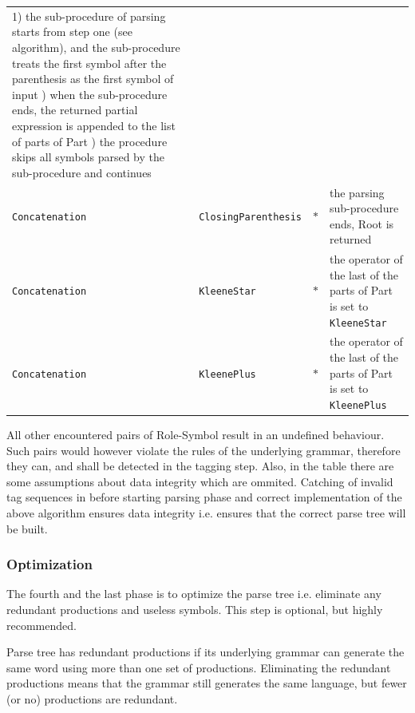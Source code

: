 \documentclass{article}
\begin{document}
\begin{tabularx}{\textwidth}{l|l|l|X}
1) the sub-procedure of parsing starts from step one (see algorithm), and the sub-procedure treats the first
symbol after the parenthesis as the first symbol of input \newline
2) when the sub-procedure ends, the returned partial expression is appended to the list of parts of Part \newline
3) the procedure skips all symbols parsed by the sub-procedure and continues \\

\verb|Concatenation| & \verb|ClosingParenthesis| & $*$ &

the parsing sub-procedure ends, Root is returned \\

\verb|Concatenation| & \verb|KleeneStar| & $*$ &

the operator of the last of the parts of Part is set to \verb|KleeneStar| \\

\verb|Concatenation| & \verb|KleenePlus| & $*$ &

the operator of the last of the parts of Part is set to \verb|KleenePlus| \\

\end{tabularx}

\vspace{10pt} All other encountered pairs of Role-Symbol result in an undefined behaviour. Such pairs would
however violate the rules of the underlying grammar, therefore they can, and shall be detected in
the tagging step. Also, in the table there are some assumptions about data integrity which are
ommited. Catching of invalid tag sequences in before starting parsing phase and correct
implementation of the above algorithm ensures data integrity i.e. ensures that the correct parse
tree will be built.

\subsubsection{Optimization}
The fourth and the last phase is to optimize the parse tree i.e. eliminate any redundant productions
and useless symbols. This step is optional, but highly recommended.

Parse tree has redundant productions if its underlying grammar can generate the same word using more
than one set of productions. Eliminating the redundant productions means that the grammar still
generates the same language, but fewer (or no) productions are redundant.
\end{document}
